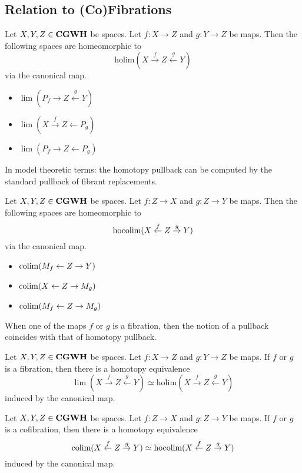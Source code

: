 \documentclass[a4paper]{article}
\begin{document}
\subsection{Relation to (Co)Fibrations}
\begin{prp}{}{} Let $X,Y,Z\in\bold{CGWH}$ be spaces. Let $f:X\to Z$ and $g:Y\to Z$ be maps. Then the following spaces are homeomorphic to $$\text{holim}(X\overset{f}{\rightarrow}Z\overset{g}{\leftarrow}Y)$$ via the canonical map. 
\begin{itemize}
\item $\lim(P_f\rightarrow Z\overset{g}{\leftarrow}Y)$
\item $\lim(X\overset{f}{\rightarrow}Z\leftarrow P_g)$
\item $\lim(P_f\rightarrow Z\leftarrow P_g)$
\end{itemize}
\end{prp}

In model theoretic terms: the homotopy pullback can be computed by the standard pullback of fibrant replacements. \\

\begin{prp}{}{} Let $X,Y,Z\in\bold{CGWH}$ be spaces. Let $f:Z\to X$ and $g:Z\to Y$ be maps. Then the following spaces are homeomorphic to $$\operatorname*{hocolim}(X\overset{f}{\leftarrow}Z\overset{g}{\rightarrow}Y)$$ via the canonical map. 
\begin{itemize}
\item $\operatorname*{colim}(M_f\leftarrow Z\rightarrow Y)$
\item $\operatorname*{colim}(X\leftarrow Z\rightarrow M_g)$
\item $\operatorname*{colim}(M_f\leftarrow Z\rightarrow M_g)$
\end{itemize}
\end{prp}

When one of the maps $f$ or $g$ is a fibration, then the notion of a pullback coincides with that of homotopy pullback. 

\begin{prp}{}{} Let $X,Y,Z\in\bold{CGWH}$ be spaces. Let $f:X\to Z$ and $g:Y\to Z$ be maps. If $f$ or $g$ is a fibration, then there is a homotopy equivalence $$\lim(X\overset{f}{\rightarrow}Z\overset{g}{\leftarrow}Y)\simeq\text{holim}(X\overset{f}{\rightarrow}Z\overset{g}{\leftarrow}Y)$$ induced by the canonical map. 
\end{prp}

\begin{prp}{}{} Let $X,Y,Z\in\bold{CGWH}$ be spaces. Let $f:Z\to X$ and $g:Z\to Y$ be maps. If $f$ or $g$ is a cofibration, then there is a homotopy equivalence $$\operatorname*{colim}(X\overset{f}{\leftarrow}Z\overset{g}{\rightarrow}Y)\simeq\text{hocolim}(X\overset{f}{\leftarrow}Z\overset{g}{\rightarrow}Y)$$ induced by the canonical map. 
\end{prp}
\end{document}
